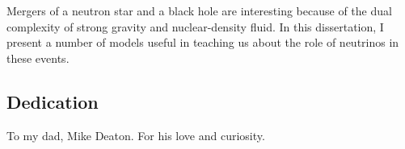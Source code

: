 \documentclass[12pt]{report}
\begin{document}
Mergers of a neutron star and a black hole are interesting because of the dual
complexity of strong gravity and nuclear-density fluid. In this dissertation,
I present a number of models useful in teaching us about the role of neutrinos
in these events.
\newpage

\tableofcontents
\newpage

\listoftables
{} %
\newpage

\listoffigures
{} %
\newpage

\begin{center}
  \subsection*{Dedication}
  To my dad, Mike Deaton. For his love and curiosity.
  \newpage
\end{center}




\newpage

%

%

%

%  



\end{document}
